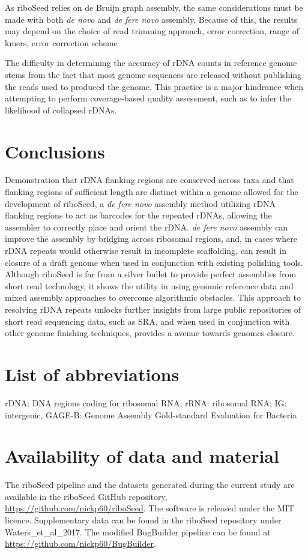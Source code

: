 \documentclass[10pt]{article}
\begin{document}
\begin{linenumbers}
As riboSeed relies on de Bruijn graph assembly, the same considerations must be made with both \textit{de novo} and \textit{de fere novo} assembly. Because of this, the results may depend on the choice of read trimming approach, error correction, range of kmers, error correction scheme

The difficulty in determining the accuracy of rDNA counts in reference genome stems from the fact that most genome sequences are released without publishing the reads used to produced the genome. This practice is a major hindrance when attempting to perform coverage-based quality assessment, such as to infer the likelihood of collapsed rDNAs.




\section*{Conclusions}
Demonstration that rDNA flanking regions are conserved across taxa and that flanking regions of sufficient length are distinct within a genome allowed for the development of riboSeed, a \textit{de fere novo} assembly method utilizing rDNA flanking regions to act as barcodes for the repeated rDNAs, allowing the assembler to correctly place and orient the rDNA. \textit{de fere novo} assembly can improve the assembly by bridging across ribosomal regions, and, in cases where rDNA repeats would otherwise result in incomplete scaffolding, can result in closure of a draft genome when used in conjunction with existing polishing tools. Although riboSeed is far from a silver bullet to provide perfect assemblies from short read technology, it shows the utility in using genomic reference data and mixed assembly approaches to overcome algorithmic obstacles. This approach to resolving rDNA repeats unlocks further insights from large public repositories of short read sequencing data, such as SRA, and when used in conjunction with other genome finishing techniques, provides a avenue towards genomes closure.

\end{linenumbers}
\baselineskip13pt

\section*{List of abbreviations}
rDNA: DNA regions coding for ribosomal RNA; rRNA: ribosomal RNA; IG: intergenic, GAGE-B: Genome Assembly Gold-standard Evaluation for Bacteria


\section*{Availability of data and material}
The riboSeed pipeline and the datasets generated during the current study are available in the riboSeed GitHub repository, \url{https://github.com/nickp60/riboSeed}. The software is released under the MIT licence. Supplementary data can be found in the riboSeed repository under Waters\_et\_al\_2017. The modified BugBuilder pipeline can be found at \url{https://github.com/nickp60/BugBuilder}.
\end{document}
